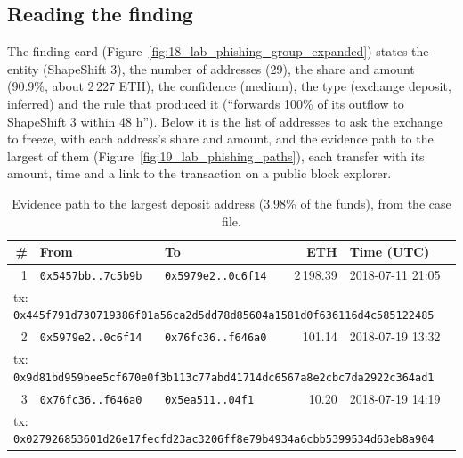 \subsection{Reading the finding}
The finding card (Figure~\ref{fig:18_lab_phishing_group_expanded}) states the entity (ShapeShift 3), the number of addresses (29), the share and amount (90.9\%, about 2\,227 ETH), the confidence (medium), the type (exchange deposit, inferred) and the rule that produced it (``forwards 100\% of its outflow to ShapeShift 3 within 48 h''). Below it is the list of addresses to ask the exchange to freeze, with each address's share and amount, and the evidence path to the largest of them (Figure~\ref{fig:19_lab_phishing_paths}), each transfer with its amount, time and a link to the transaction on a public block explorer.


\begin{table}[H]
\centering\small\singlespacing
\begin{tabular}{r p{2.9cm} p{2.9cm} r p{2.5cm}}
\toprule
\textbf{\#} & \textbf{From} & \textbf{To} & \textbf{ETH} & \textbf{Time (UTC)}\\\midrule
1 & \texttt{0x5457bb..7c5b9b} & \texttt{0x5979e2..0c6f14} & 2\,198.39 & 2018-07-11 21:05\\
\multicolumn{5}{l}{\quad tx: \texttt{\scriptsize 0x445f791d730719386f01a56ca2d5dd78d85604a1581d0f636116d4c585122485}}\\
2 & \texttt{0x5979e2..0c6f14} & \texttt{0x76fc36..f646a0} & 101.14 & 2018-07-19 13:32\\
\multicolumn{5}{l}{\quad tx: \texttt{\scriptsize 0x9d81bd959bee5cf670e0f3b113c77abd41714dc6567a8e2cbc7da2922c364ad1}}\\
3 & \texttt{0x76fc36..f646a0} & \texttt{0x5ea511..04f1} & 10.20 & 2018-07-19 14:19\\
\multicolumn{5}{l}{\quad tx: \texttt{\scriptsize 0x027926853601d26e17fecfd23ac3206ff8e79b4934a6cbb5399534d63eb8a904}}\\
\bottomrule\end{tabular}
\caption{Evidence path to the largest deposit address (3.98\% of the funds), from the case file.}
\label{tab:path_phish_top}
\end{table}

